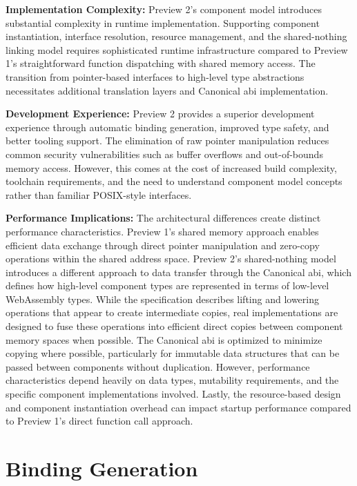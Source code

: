 \textbf{Implementation Complexity:} Preview 2's component model introduces substantial complexity in runtime implementation. Supporting component instantiation, interface resolution, resource management, and the shared-nothing linking model requires sophisticated runtime infrastructure compared to Preview 1's straightforward function dispatching with shared memory access. The transition from pointer-based interfaces to high-level type abstractions necessitates additional translation layers and Canonical \acrshort{abi} implementation.

\textbf{Development Experience:} Preview 2 provides a superior development experience through automatic binding generation, improved type safety, and better tooling support. The elimination of raw pointer manipulation reduces common security vulnerabilities such as buffer overflows and out-of-bounds memory access. However, this comes at the cost of increased build complexity, toolchain requirements, and the need to understand component model concepts rather than familiar POSIX-style interfaces.

\textbf{Performance Implications:} The architectural differences create distinct performance characteristics. Preview 1's shared memory approach enables efficient data exchange through direct pointer manipulation and zero-copy operations within the shared address space. Preview 2's shared-nothing model introduces a different approach to data transfer through the Canonical \acrshort{abi}, which defines how high-level component types are represented in terms of low-level WebAssembly types. While the specification describes lifting and lowering operations that appear to create intermediate copies, real implementations are designed to fuse these operations into efficient direct copies between component memory spaces when possible. The Canonical \acrshort{abi} is optimized to minimize copying where possible, particularly for immutable data structures that can be passed between components without duplication. However, performance characteristics depend heavily on data types, mutability requirements, and the specific component implementations involved. Lastly, the resource-based design and component instantiation overhead can impact startup performance compared to Preview 1's direct function call approach.

\section{Binding Generation}
\label{sec:wit-binding}

